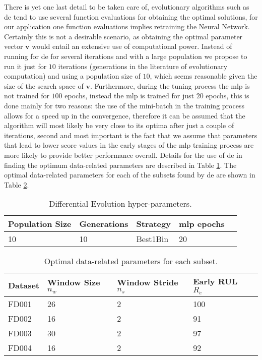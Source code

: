 There is yet one last detail to be taken care of, evolutionary algorithms such as \gls{de} tend to use several function evaluations for obtaining the optimal solutions,  for our application one function evaluations implies retraining the Neural Network. Certainly this is not a desirable scenario, as obtaining the optimal parameter vector $\mathbf{v}$ would entail an extensive use of computational power. Instead of running for \gls{de} for several iterations and with a large population we propose to run it just for $10$ iterations (generations in the literature of evolutionary computation) and using a population size of $10$, which seems reasonable given the size of the search space of $\mathbf{v}$. Furthermore, during the tuning process the \gls{mlp} is not trained for  $100$ epochs, instead the \gls{mlp} is trained for just $20$ epochs, this is done mainly for two reasons: the use of the mini-batch in the training process allows for a speed up in the convergence, therefore it can be assumed that the algorithm will most likely be very close to its optima after just a couple of iterations, second and most important is the fact that we assume that parameters that lead to lower score values in the early stages of the \gls{mlp} training process are more likely to provide better performance overall. Details for the use of \gls{de} in finding the optimum data-related parameters are described in Table \ref{table:de_hyperparams}. The optimal data-related parameters for each of the subsets found by \gls{de} are shown in Table \ref{table:optimal_data_params}.

\begin{table}[!htb]
\centering
\begin{tabular}{l l l l l}
	\hline
	 Population Size & Generations & Strategy & \gls{mlp} epochs\\
  	\hline
  	10 & 10 & Best1Bin & 20\\
  	\hline
\end{tabular}
\caption{Differential Evolution hyper-parameters.}
\label{table:de_hyperparams}
\end{table}

\begin{table}[!htb]
\centering
\begin{tabular}{l l l l l}
	\hline
	 Dataset & Window Size $n_w$ & Window Stride $n_s$ & Early RUL $R_e$\\
  	\hline
  	FD001 & 26 & 2 & 100\\
  	FD002 & 16 & 2 & 91\\
  	FD003 & 30 & 2 & 97\\
  	FD004 & 16 & 2 & 92\\
  	\hline
\end{tabular}
\caption{Optimal data-related parameters for each subset.}
\label{table:optimal_data_params}
\end{table}

